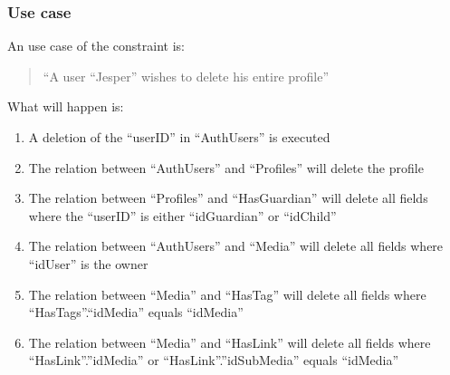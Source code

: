 \subsubsection*{Use case}
 An use case of the constraint is:
\begin{quotation}
``A user ``Jesper'' wishes to delete his entire profile''
\end{quotation}
What will happen is:
\begin{enumerate}
	\item A deletion of the ``userID'' in ``AuthUsers'' is executed
	\item The relation between ``AuthUsers'' and ``Profiles'' will delete the profile
	\item The relation between ``Profiles'' and ``HasGuardian'' will delete all fields where the ``userID'' is either ``idGuardian'' or ``idChild''
	\item The relation between ``AuthUsers'' and ``Media'' will delete all fields where ``idUser'' is the owner
	\item The relation between ``Media'' and ``HasTag'' will delete all fields where ``HasTags''.``idMedia'' equals ``idMedia''
	\item The relation between ``Media'' and ``HasLink'' will delete all fields where ``HasLink''.''idMedia'' or ``HasLink''.''idSubMedia'' equals ``idMedia''
\end{enumerate}

